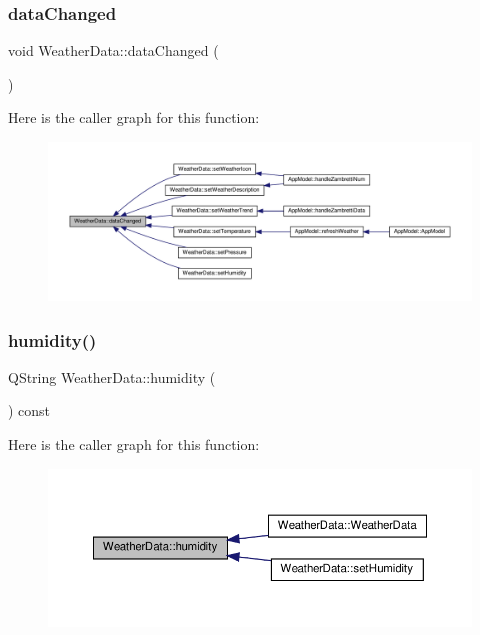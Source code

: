 \subsubsection{\texorpdfstring{data\+Changed}{dataChanged}}
{\footnotesize\ttfamily void Weather\+Data\+::data\+Changed (\begin{DoxyParamCaption}{ }\end{DoxyParamCaption})\hspace{0.3cm}{\ttfamily [signal]}}

Here is the caller graph for this function\+:\nopagebreak
\begin{figure}[H]
\begin{center}
\leavevmode
\includegraphics[width=350pt]{class_weather_data_a23185106cf22ef8c57c96154e37b24d1_icgraph}
\end{center}
\end{figure}
\mbox{\label{class_weather_data_a0a83b2ee5398eaba062e3c6fe9264a3d}} 
\subsubsection{\texorpdfstring{humidity()}{humidity()}}
{\footnotesize\ttfamily Q\+String Weather\+Data\+::humidity (\begin{DoxyParamCaption}{ }\end{DoxyParamCaption}) const}

Here is the caller graph for this function\+:\nopagebreak
\begin{figure}[H]
\begin{center}
\leavevmode
\includegraphics[width=350pt]{class_weather_data_a0a83b2ee5398eaba062e3c6fe9264a3d_icgraph}
\end{center}
\end{figure}
\mbox{\label{class_weather_data_af726e713890bd6d310fe4a718dd69c77}} 
